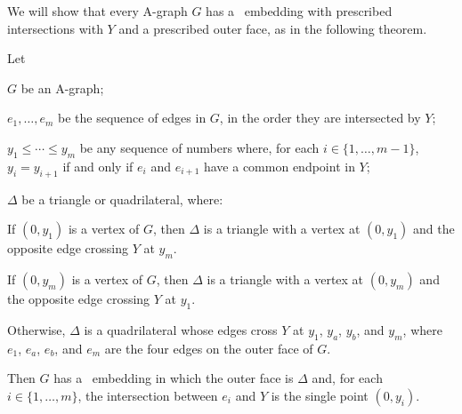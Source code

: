 %
%

We will show that every A-graph $G$ has a \Fary\ embedding with prescribed intersections with $Y$ and a prescribed outer face, as in the following theorem. 

\begin{thm}
	Let
	\begin{compactenum}
		\item $G$ be an A-graph;
		\item $e_1,\ldots,e_m$ be the sequence of edges in $G$,
		in the order they are intersected by $Y$;
		\item $y_1\le\cdots\le y_m$ be any sequence of numbers where, for
		each $i\in\{1,\ldots,m-1\}$, $y_i=y_{i+1}$ if and only if $e_i$
		and $e_{i+1}$ have a common endpoint in $Y$;
		\item $\Delta$ be a triangle or quadrilateral, where:
		\begin{compactenum}
			\item If $(0,y_1)$ is a vertex of $G$, then $\Delta$ is a triangle
			with a vertex at $(0,y_1)$ and the opposite edge crossing $Y$ at $y_m$.
			
			\item If $(0,y_m)$ is a vertex of $G$, then $\Delta$ is a triangle
			with a vertex at $(0,y_m)$ and the opposite edge crossing $Y$ at $y_1$.
			
			\item Otherwise, $\Delta$ is a quadrilateral whose edges cross $Y$ at $y_1$, $y_a$,
			$y_b$, and $y_m$, where $e_1$, $e_a$, $e_b$, and $e_m$ are the four edges on the outer face of $G$.
		\end{compactenum}
	\end{compactenum}
	Then $G$ has a
	\Fary\ embedding in which the outer face is $\Delta$
	and, for each $i\in\{1,\ldots,m\}$, the intersection between $e_i$ and $Y$
	is the single point $(0,y_i)$.
\end{thm}

